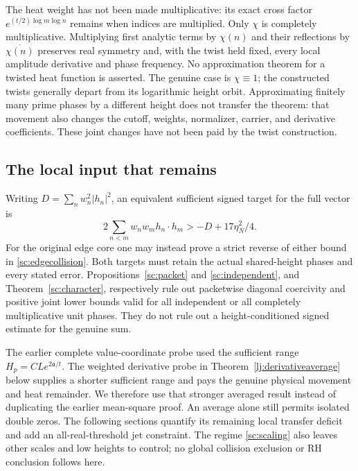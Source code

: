 \documentclass[11pt]{article}
\numberwithin{equation}{section}
\theoremstyle{definition}
\theoremstyle{remark}
\begin{document}
The heat weight has not been made multiplicative: its exact cross factor
$e^{(t/2)\log m\log n}$ remains when indices are multiplied.
Only $\chi$ is completely multiplicative. Multiplying first analytic
terms by $\chi(n)$ and their reflections by $\overline{\chi(n)}$
preserves real symmetry and, with the twist held fixed, every local
amplitude derivative and phase frequency. No approximation theorem for
a twisted heat function is asserted. The genuine case is $\chi\equiv1$;
the constructed twists generally depart from its logarithmic height orbit.
Approximating finitely many prime phases by a different height does not
transfer the theorem: that movement also changes the cutoff, weights,
normalizer, carrier, and derivative coefficients. These joint changes
have not been paid by the twist construction.

\subsection{The local input that remains}
\label{sc:remaining}
Writing $D=\sum_nw_n^2|h_n|^2$, an equivalent sufficient signed target
for the full vector is
\begin{equation}\label{sc:signedtarget}
 2\sum_{n<m}w_nw_mh_n\cdot h_m>-D+17\eta_N^2/4.
\end{equation}
For the original edge core one may instead prove a strict reverse of
either bound in \eqref{sc:edgecollision}. Both targets must retain the
actual shared-height phases and every stated error.
Propositions~\ref{sc:packet} and \ref{sc:independent}, and
Theorem~\ref{sc:character}, respectively rule out packetwise diagonal
coercivity and positive joint lower bounds valid for all independent or
all completely multiplicative unit phases. They do not rule out a
height-conditioned signed estimate for the genuine sum.

The earlier complete value-coordinate probe used the sufficient range
$H_p=CLe^{2\mathfrak a/t}$. The weighted derivative probe in
Theorem~\ref{lj:derivativeaverage} below supplies a shorter sufficient
range and pays the genuine physical movement and heat remainder.
We therefore use that stronger averaged result instead of duplicating
the earlier mean-square proof. An average alone still permits isolated
double zeros. The following sections quantify its remaining local
transfer deficit and add an all-real-threshold jet constraint. The
regime \eqref{sc:scaling} also leaves other scales and low heights to
control; no global collision exclusion or RH conclusion follows here.
\end{document}
